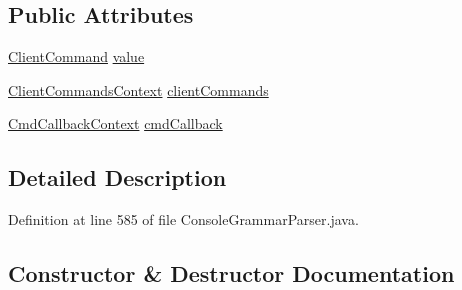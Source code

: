 \subsection*{Public Attributes}
\begin{DoxyCompactItemize}
\item 
\hyperlink{classgov_1_1nasa_1_1jpf_1_1inspector_1_1client_1_1_client_command}{Client\+Command} \hyperlink{classgov_1_1nasa_1_1jpf_1_1inspector_1_1client_1_1parser_1_1_console_grammar_parser_1_1_client_command_with_c_b_context_a8c91d28b0afd2c745beca164647c98a8}{value}
\item 
\hyperlink{classgov_1_1nasa_1_1jpf_1_1inspector_1_1client_1_1parser_1_1_console_grammar_parser_1_1_client_commands_context}{Client\+Commands\+Context} \hyperlink{classgov_1_1nasa_1_1jpf_1_1inspector_1_1client_1_1parser_1_1_console_grammar_parser_1_1_client_command_with_c_b_context_a32ed2cf19015185b8a17cadde81b63ec}{client\+Commands}
\item 
\hyperlink{classgov_1_1nasa_1_1jpf_1_1inspector_1_1client_1_1parser_1_1_console_grammar_parser_1_1_cmd_callback_context}{Cmd\+Callback\+Context} \hyperlink{classgov_1_1nasa_1_1jpf_1_1inspector_1_1client_1_1parser_1_1_console_grammar_parser_1_1_client_command_with_c_b_context_a74f3476e056a04be8612f49e83f722cf}{cmd\+Callback}
\end{DoxyCompactItemize}


\subsection{Detailed Description}


Definition at line 585 of file Console\+Grammar\+Parser.\+java.



\subsection{Constructor \& Destructor Documentation}
